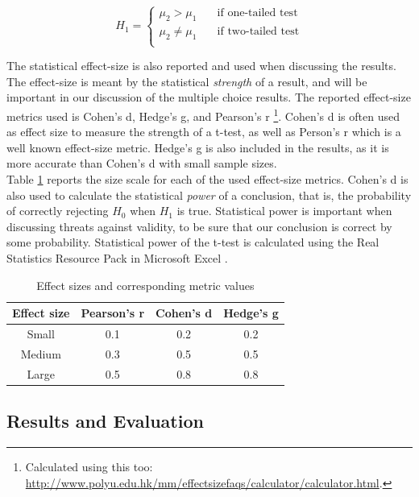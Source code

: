 \begin{equation} \label{eq:h1-t-test}
   H_1 =
    \begin{cases}
        \mu_{2} > \mu_{1} & \quad \text{if one-tailed test}\\
        \mu_{2} \neq \mu_{1} & \quad \text{if two-tailed test}\\
    \end{cases}
\end{equation}

The statistical effect-size is also reported and used when discussing the results. The effect-size is meant by the statistical \textit{strength} of a result, and will be important in our discussion of the multiple choice results. The reported effect-size metrics used is Cohen's d, Hedge's g, and Pearson's r \cite{cumming2013}\footnote{Calculated using this too: \url{http://www.polyu.edu.hk/mm/effectsizefaqs/calculator/calculator.html}.}. Cohen's d is often used as effect size to measure the strength of a t-test, as well as Person's r which is a well known effect-size metric. Hedge's g is also included in the results, as it is more accurate than Cohen's d with small sample sizes. \\

Table \ref{tab:effect-size} reports the size scale for each of the used effect-size metrics. Cohen's d is also used to calculate the statistical \textit{power} of a conclusion, that is, the probability of correctly rejecting $H_0$ when $H_1$ is true. Statistical power is important when discussing threats against validity, to be sure that our conclusion is correct by some probability. Statistical power of the t-test is calculated using the Real Statistics Resource Pack in Microsoft Excel \cite{RSRP}.

\begin{table}[t!]
    \centering
    \begin{tabular}{ | c | c | c | c |}
    \hline
    \textbf{Effect size} & \textbf{Pearson's r} & \textbf{Cohen's d} & \textbf{Hedge's g} \\ \hline
    Small & 0.1 & 0.2 & 0.2 \\ \hline
    Medium & 0.3 & 0.5 & 0.5 \\ \hline
    Large & 0.5 & 0.8 & 0.8 \\ \hline
    \end{tabular}
    \caption{Effect sizes and corresponding metric values}
    \label{tab:effect-size}
\end{table}

\subsection{Results and Evaluation}

